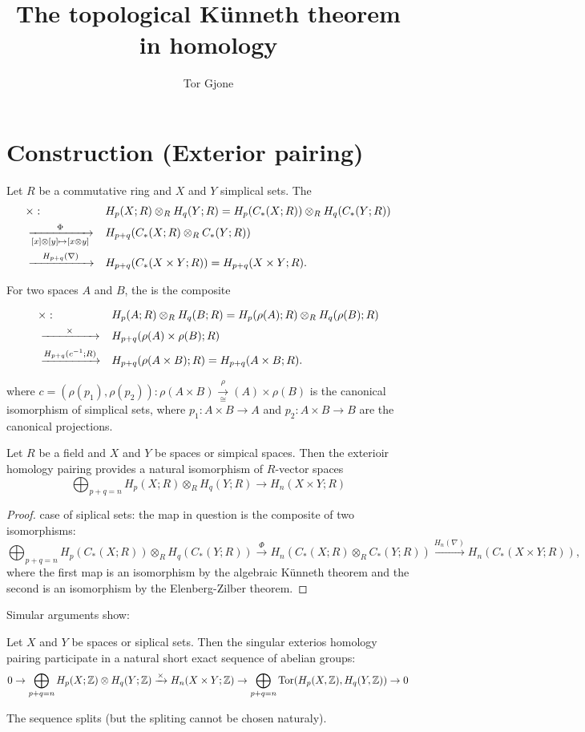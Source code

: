 \documentclass[a4paper,11pt,english]{article}
\title{\textbf{The topological Künneth theorem in homology}}
\author{Tor Gjone}
\begin{document}
\mmaketitle

\section{Construction (Exterior pairing)}
Let $R$ be a commutative ring and $X$ and $Y$ simplical sets. The 
\begin{align*}
& \times : && H_p(X; R) \otimes_R H_q(Y; R) = H_p(C_*(X; R)) \otimes_R H_q(C_*(Y; R)) \\ 
& \xrightarrow[{[x]\otimes[y] \mapsto [x\otimes y]}]{\Phi}  && H_{p+q}(C_*(X;R)\otimes_R C_*(Y;R))  \\
& \xrightarrow{\quad H_{p+q}(\nabla)\quad} && H_{p+q}(C_*(X\times Y; R)) = H_{p+q}(X\times Y;R).
\end{align*} 

For two spaces $A$ and $B$, the  is the composite

\begin{align*}
& \times : 
&& H_p(A; R) \otimes_R H_q(B; R) = H_{p} (\rho(A); R) \otimes_R H_q(\rho(B);R) \\ 
& \xrightarrow{\quad\quad\times\quad\quad}  
&&  H_{p+q}(\rho(A)\times\rho(B); R)  \\
& \xrightarrow{H_{p+q}(c^{-1};R)}
&& H_{p+q}(\rho(A\times B); R) = H_{p+q}(A\times B;R).
\end{align*} 

where $c = (\rho(p_1), \rho(p_2)): \rho(A \times B) \xrightarrow[\cong] \rho(A)\times \rho(B)$ is the canonical isomorphism of simplical sets, where $p_1 : A\times B \to A$ and $p_2 : A\times B \to B$ are the canonical projections.

\begin{them}
Let $R$ be a field and $X$ and $Y$ be spaces or simpical spaces. Then the exterioir homology pairing provides a natural isomorphism of $R$-vector spaces
\[ \bigoplus_{p+q=n} H_p(X;R)\otimes_R H_q(Y;R) \to H_n(X\times Y; R) \]
\end{them}

\begin{proof}
case of siplical sets: the map in question is the composite of two isomorphisms: 
\[ \bigoplus_{p+q=n} H_p(C_*(X; R)) \otimes_R H_q(C_*(Y; R)) \xrightarrow{\Phi} 
H_n(C_*(X;R)\otimes_R C_*(Y;R)) \xrightarrow{H_n(\nabla)}
H_n(C_*(X\times Y; R)), \]
where the first map is an isomorphism by the algebraic Künneth theorem and the second is an isomorphism by the Elenberg-Zilber theorem.
\end{proof}

Simular arguments show:

\begin{them}
Let $X$ and $Y$ be spaces or siplical sets. Then the singular exterios homology pairing participate in a natural short exact sequence of abelian groups: 
\[ 0 \to \bigoplus_{p+q=n} H_p(X;\mathbb{Z}) \otimes H_q(Y;\mathbb{Z}) \xrightarrow{\times} H_n(X\times Y; \mathbb{Z}) \to \bigoplus_{p+q=n} \operatorname{Tor}(H_p(X,\mathbb{Z}), H_q(Y,\mathbb{Z})) \to 0 \]

The sequence splits (but the spliting cannot be chosen naturaly).
\end{them}
\end{document}
